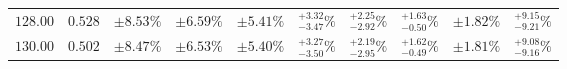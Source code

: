 \begin{table}[ht!]
{{\begin{tabular}{| cc | ccc | cccc | c |}
$128.00$ & $0.528$ & $\pm8.53\%$ & {\color{black!55}$\pm 6.59\%$} & {\color{black!55}$\pm 5.41\%$} & $^{+3.32}_{-3.47}\%$ & {\color{black!55}$^{+2.25}_{-2.92}\%$} & {\color{black!55}$^{+1.63}_{-0.50}\%$} & {\color{black!55}$\pm 1.82\%$} & $^{+9.15}_{-9.21}\%$  \\
$130.00$ & $0.502$ & $\pm8.47\%$ & {\color{black!55}$\pm 6.53\%$} & {\color{black!55}$\pm 5.40\%$} & $^{+3.27}_{-3.50}\%$ & {\color{black!55}$^{+2.19}_{-2.95}\%$} & {\color{black!55}$^{+1.62}_{-0.49}\%$} & {\color{black!55}$\pm 1.81\%$} & $^{+9.08}_{-9.16}\%$  \\
\cline{1-10}
\end{tabular}
}
}
\end{table}

